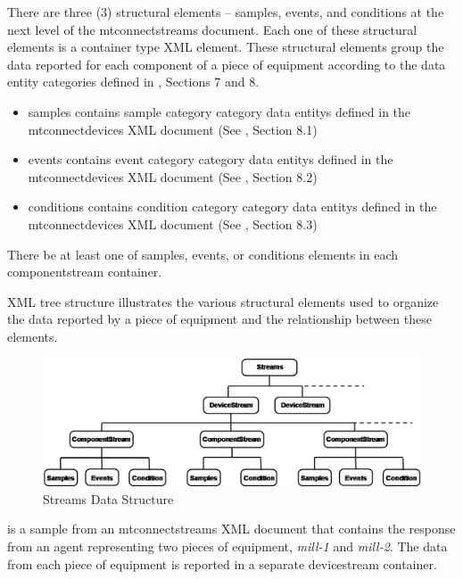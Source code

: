 There are three (3) \glspl{structural element} – \gls{samples}, \gls{events}, and \gls{conditions} at the next level of the \gls{mtconnectstreams} document.  Each one of these \glspl{structural element} is a container type XML element.  These \glspl{structural element} group the data reported for each component of a piece of equipment according to the \gls{data entity} categories defined in , Sections 7 and 8.  

\begin{itemize}

\item \gls{samples} contains \gls{sample category} category \glspl{data entity} defined in the \gls{mtconnectdevices} XML document (See , Section 8.1)

\item \gls{events} contains \gls{event category} category \glspl{data entity} defined in the \gls{mtconnectdevices} XML document (See , Section 8.2)

\item \gls{conditions} contains \gls{condition category} category \glspl{data entity} defined in the \gls{mtconnectdevices} XML document (See , Section 8.3)
\end{itemize}

There \must be at least one of \gls{samples}, \gls{events}, or \gls{conditions} elements in each \gls{componentstream} container. 

 XML tree structure illustrates the various \glspl{structural element} used to organize the data reported by a piece of equipment and the relationship between these elements. 

\begin{figure}[ht]
  \centering
  \includegraphics[width=1.0\textwidth]{figures/streams-data-structure.png}
  \caption{Streams Data Structure}
  \label{fig:streams-data-structure}
\end{figure}

 is a sample from an \gls{mtconnectstreams} XML document that contains the response from an \gls{agent} representing two pieces of equipment, \textit{mill-1} and \textit{mill-2}. The data from each piece of equipment is reported in a separate \gls{devicestream} container. 

